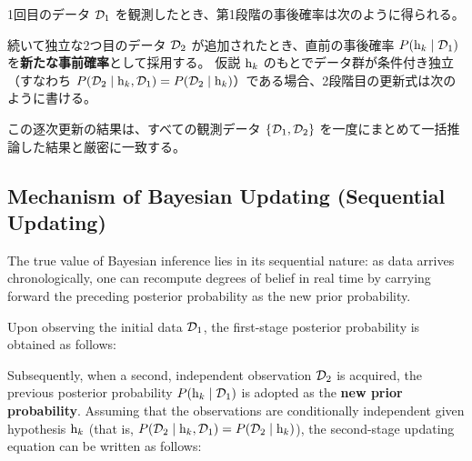 1回目のデータ $\mathcal{D}_1$ を観測したとき、第1段階の事後確率は次のように得られる。



続いて独立な2つ目のデータ $\mathcal{D}_2$ が追加されたとき、直前の事後確率 $P( \mathrm{h}_{k} \mid \mathcal{D}_1 )$ を\textbf{新たな事前確率}として採用する。
仮説 $\mathrm{h}_{k}$ のもとでデータ群が条件付き独立（すなわち $P( \mathcal{D}_2 \mid \mathrm{h}_{k}, \mathcal{D}_1 ) = P( \mathcal{D}_2 \mid \mathrm{h}_{k} )$）である場合、2段階目の更新式は次のように書ける。



この逐次更新の結果は、すべての観測データ $\{\mathcal{D}_1, \mathcal{D}_2\}$ を一度にまとめて一括推論した結果と厳密に一致する。



\else
    \subsection{Mechanism of Bayesian Updating (Sequential Updating)}
    The true value of Bayesian inference lies in its sequential nature: as data arrives chronologically, one can recompute degrees of belief in real time by carrying forward the preceding posterior probability as the new prior probability.

    Upon observing the initial data $\mathcal{D}_1$, the first-stage posterior probability is obtained as follows:

    

    Subsequently, when a second, independent observation $\mathcal{D}_2$ is acquired, the previous posterior probability $P( \mathrm{h}_{k} \mid \mathcal{D}_1 )$ is adopted as the \textbf{new prior probability}.
    Assuming that the observations are conditionally independent given hypothesis $\mathrm{h}_{k}$ (that is, $P( \mathcal{D}_2 \mid \mathrm{h}_{k}, \mathcal{D}_1 ) = P( \mathcal{D}_2 \mid \mathrm{h}_{k} )$), the second-stage updating equation can be written as follows:

    

